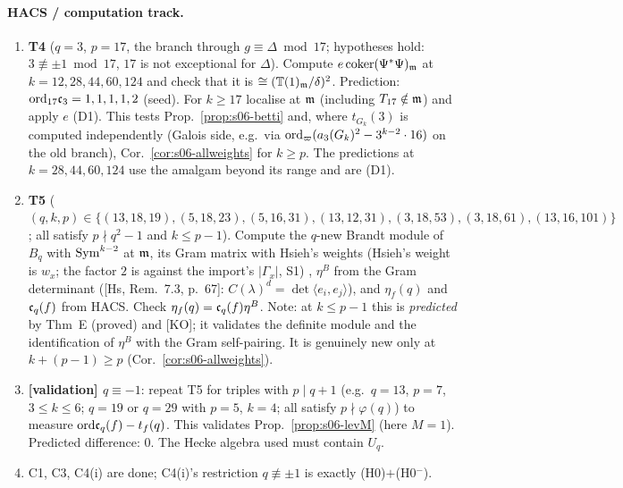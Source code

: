 \paragraph{HACS / computation track.}
\begin{enumerate}[label=H\arabic*.]
\item \textbf{T4} ($q=3$, $p=17$, the branch through $g\equiv\Delta\bmod17$; hypotheses hold: $3\not\equiv\pm1\bmod17$, $17$ is not
  exceptional for $\Delta$). Compute $e\operatorname{coker}(\Psi^*\Psi)_{\mathfrak{m}}$ at $k=12,28,44,60,124$ and check that it is $\cong(\mathbb{T}(1)_{\mathfrak{m}}/\delta)^2$.
  Prediction: $\mathrm{ord}_{17}\mathfrak{c}_3=1,1,1,1,2$ (seed). For $k\ge17$ localise at $\mathfrak{m}$ (including $T_{17}\notin\mathfrak{m}$) and apply $e$ (D1).
  This tests Prop.~\ref{prop:s06-betti} and, where $t_{G_k}(3)$ is computed independently (Galois side, e.g.\ via
  $\mathrm{ord}_\varpi(a_3(G_k)^2-3^{k-2}\cdot16)$ on the old branch), Cor.~\ref{cor:s06-allweights} for $k\ge p$. The predictions at
  $k=28,44,60,124$ use the amalgam beyond its range and are \stexp{} (D1). 
\item \textbf{T5} ($(q,k,p)\in\{(13,18,19),(5,18,23),(5,16,31),(13,12,31),(3,18,53),(3,18,61),(13,16,101)\}$; all satisfy
  $p\nmid q^2-1$ and $k\le p-1$). Compute the $q$-new Brandt module of $B_q$ with $\mathrm{Sym}^{k-2}$ at $\mathfrak{m}$, its Gram matrix with Hsieh's
  weights (Hsieh's weight is $w_x$; the factor $2$ is against the import's $|\Gamma_x|$, S1) , $\eta^B$ from the Gram determinant ([Hs, Rem.~7.3, p.~67]:
  $C(\lambda)^d=\det\langle e_i,e_j\rangle$), and $\eta_f(q)$ and $\mathfrak{c}_q(f)$ from HACS. Check $\eta_f(q)=\mathfrak{c}_q(f)\eta^B$. Note: at
  $k\le p-1$ this is \emph{predicted} by Thm~E (proved) and [KO]; it validates the definite module and the identification of $\eta^B$
  with the Gram self-pairing. It is genuinely new only at $k+(p-1)\ge p$ (Cor.~\ref{cor:s06-allweights}).
\item \textbf{[validation] $q\equiv-1$}: repeat T5 for triples with $p\mid q+1$ (e.g.\ $q=13$, $p=7$, $3\le k\le6$; $q=19$ or $q=29$ with $p=5$, $k=4$;
  all satisfy $p\nmid\varphi(q)$) to measure $\mathrm{ord}\mathfrak{c}_q(f)-t_f(q)$. This validates Prop.~\ref{prop:s06-levM} (here $M=1$). Predicted
  difference: $0$. The Hecke algebra used must contain $U_q$. 
\item C1, C3, C4(i) are done; C4(i)'s restriction $q\not\equiv\pm1$ is exactly (H0)$+$(H0$^-$).
\end{enumerate}

